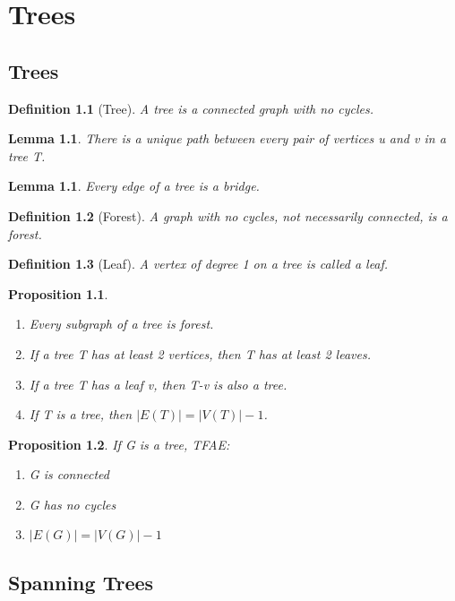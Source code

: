 \documentclass[11pt, oneside]{book}
\theoremstyle{break}
\newtheorem{lemma}[thm]{Lemma}
\newtheorem{propo}{Proposition}[section]
\newtheorem{defn}{Definition}[section]
\begin{document}
\chapter{Trees}


\section{Trees}

\begin{defn}[Tree]
	A tree is a connected graph with no cycles.
\end{defn}

\begin{lemma}
	There is a unique path between every pair of vertices u and v in a tree T.
\end{lemma}

\begin{lemma}
	Every edge of a tree is a bridge.
\end{lemma}

\begin{defn}[Forest]
	A graph with no cycles, not necessarily connected, is a forest.
\end{defn}

\begin{defn}[Leaf]
	A vertex of degree 1 on a tree is called a leaf.
\end{defn}

\begin{propo}
	\begin{enumerate}
		\item Every subgraph of a tree is forest.
		\item If a tree T has at least 2 vertices, then T has at least 2 leaves.
		\item If a tree T has a leaf v, then T-v is also a tree.
		\item If T is a tree, then $|E(T)| = |V(T)| - 1$.
	\end{enumerate}
\end{propo}

\begin{propo}
	If G is a tree, TFAE:
	\begin{enumerate}
		\item G is connected
		\item G has no cycles
		\item $|E(G)| = |V(G)| - 1$
	\end{enumerate}
\end{propo}


\section{Spanning Trees}
\end{document}
